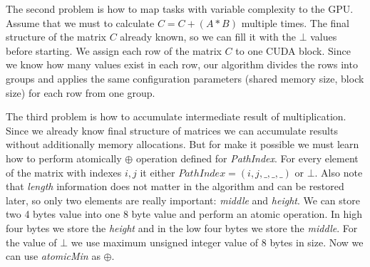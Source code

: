 The second problem is how to map tasks with variable complexity to the GPU. Assume that we must to calculate $C = C + (A * B)$ multiple times. The final structure of the matrix $C$ already known, so we can fill it with the $\bot$ values before starting. We assign each row of the matrix $C$ to one CUDA block. Since we know how many values exist in each row, our algorithm divides the rows into groups and applies the same configuration parameters (shared memory size, block size) for each row from one group.
 
The third problem is how to accumulate intermediate result of multiplication. Since we already know final structure of matrices we can accumulate results without additionally memory allocations. But for make it possible we must learn how to perform atomically $\oplus$ operation defined for \textit{PathIndex}. For every element of the matrix with indexes $i,j$ it either $PathIndex = (i,j,\_,\_,\_)$ or $\bot$. Also note that \textit{length} information does not matter in the algorithm and can be restored later, so only two elements are really important: \textit{middle} and \textit{height}. We can store two 4 bytes value into one 8 byte value and perform an atomic operation. In high four bytes we store the \textit{height} and in the low four bytes we store the \textit{middle}. For the value of $\bot$ we use maximum unsigned integer value of 8 bytes in size. Now we can use \textit{atomicMin} as $\oplus$.